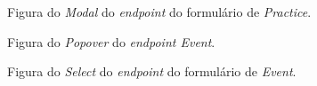 \begin{figure}[h]
	\begin{center}
	\end{center}
	\caption{Figura do \textit{Modal} do \textit{endpoint} do formulário de \textit{Practice}.}\label{fig:practiceformmodal}
\end{figure}
\newpage

\begin{figure}[h]
	\begin{center}
	\end{center}
	\caption{Figura do \textit{Popover} do \textit{endpoint Event}.}\label{fig:eventpopover}
\end{figure}

\begin{figure}[h]
	\begin{center}
	\end{center}
	\caption{Figura do \textit{Select} do \textit{endpoint} do formulário de \textit{Event}.}\label{fig:eventformselect}
\end{figure}
 \newpage
 
